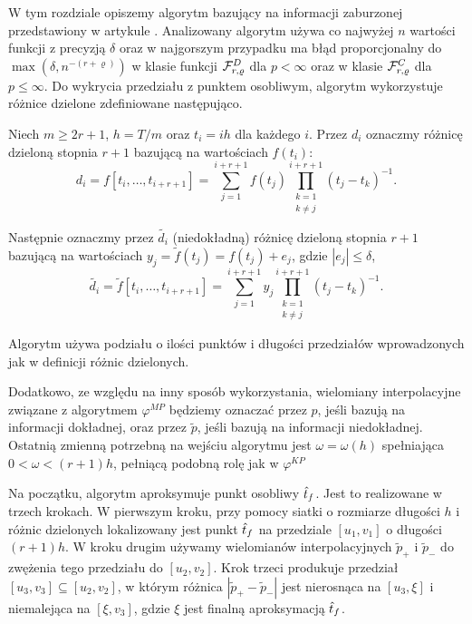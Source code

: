 \documentclass[oik, pdftex, man]{mgrwms}
\begin{document}
    W tym rozdziale opiszemy algorytm bazujący na informacji zaburzonej przedstawiony w artykule \cite{AoP}. Analizowany algorytm używa co najwyżej $n$ wartości funkcji z precyzją $\delta $ oraz w najgorszym przypadku ma błąd proporcjonalny do $\max{(\delta, n^{-(r + \varrho) })}$ w klasie funkcji $\mathcal{F}^D_{r,\varrho }$ dla $p < \infty$ oraz w klasie $\mathcal{F}^C_{r,\varrho }$ dla $p \leq \infty$. Do wykrycia przedziału z punktem osobliwym, algorytm wykorzystuje różnice dzielone zdefiniowane następująco.
    
    Niech $m \geq 2r + 1$, $h = T/ m$ oraz $t_{i} = ih$ dla każdego $i$. Przez $d_{i}$ oznaczmy różnicę dzieloną stopnia $r+1$ bazującą na wartościach $f(t_{i})$:
    \begin{equation} \label{eq:30:roznica_dzielna}
        d_{i} = f[t_{i}, \dots, t_{i+r+1}] = \sum_{j = 1}^{i+r+1} f(t_{j}) \prod_{\substack{k=1 \\ k \neq j}}^{i+r+1}(t_{j}-t_{k})^{-1}.
    \end{equation}

    Następnie oznaczmy przez $\tilde{d_i}$ (niedokładną) różnicę dzieloną stopnia $r+1$ bazującą na wartościach $y_{j} = \tilde{f}(t_{j}) = f(t_{j}) + e_{j}$, gdzie $|e_{j}| \leq \delta$,
    \begin{equation} \label{eq:31:niedokladna_roznica_dzielna}
        \tilde{d_{i}} = \tilde{f}[t_{i}, \dots, t_{i+r+1}] = \sum_{j = 1}^{i+r+1} y_{j} \prod_{\substack{k=1 \\ k \neq j}}^{i+r+1}(t_{j}-t_{k})^{-1}.
    \end{equation}

    Algorytm używa podziału o ilości punktów i długości przedziałów wprowadzonych jak w definicji różnic dzielonych. 
    
    Dodatkowo, ze względu na inny sposób wykorzystania, wielomiany interpolacyjne związane z algorytmem $\varphi^{MP}$ będziemy oznaczać przez $p$, jeśli bazują na informacji dokładnej, oraz przez $\tilde{p}$, jeśli bazują na informacji niedokładnej. Ostatnią zmienną potrzebną na wejściu algorytmu jest $\omega  = \omega(h)$ spełniająca $0 < \omega < (r + 1)h $, pełniącą podobną rolę jak w $\varphi^{KP}$
    
    Na początku, algorytm aproksymuje punkt osobliwy $\hat{t}_f$. Jest to realizowane w trzech krokach. W pierwszym kroku, przy pomocy siatki o rozmiarze długości $h$ i różnic dzielonych lokalizowany jest punkt $\hat{t}_f$ na przedziale $[u_1, v_1]$ o długości $(r + 1)h$. W kroku drugim używamy wielomianów interpolacyjnych $\tilde{p}_+$ i $\tilde{p}_-$ do zwężenia tego przedziału do $[u_2, v_2]$. Krok trzeci produkuje przedział $[u_3, v_3] \subseteq [u_2, v_2]$, w którym różnica $|\tilde{p}_{+} - \tilde{p}_{-}|$ jest nierosnąca na $[u_3, \xi]$ i niemalejąca na $[\xi, v_3]$, gdzie $\xi$ jest finalną aproksymacją $\hat{t}_f$.
\end{document}
